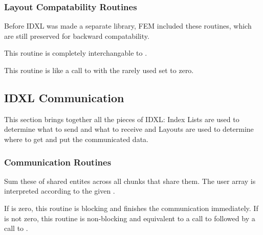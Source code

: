 \subsubsection{Layout Compatability Routines}

Before IDXL was made a separate library, FEM included these routines,
which are still preserved for backward compatability.


This routine is completely interchangable to .



This routine is like a call to  with the rarely
used  set to zero.



\subsection{IDXL Communication}
\label{sec:IDXL_Comm}
This section brings together all the pieces of IDXL: Index Lists are used to determine what to send and what to receive and Layouts are used to determine where to get and put the communicated data.


\subsubsection{Communication Routines}


Sum these  of shared entites across all chunks that share them.
The user  array is interpreted according to the given .

If  is zero, this routine is blocking and finishes the communication immediately.
If  is not zero, this routine is non-blocking and equivalent to a call to 
 followed by a call to .

